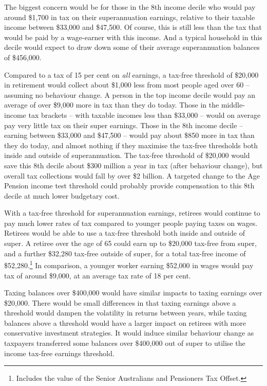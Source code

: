The biggest concern would be for those in the 8th income decile who would pay around \$1,700 in tax on their superannuation earnings, relative to their taxable income between \$33,000 and \$47,500. Of course, this is still less than the tax that would be paid by a wage-earner with this income. And a typical household in this decile would expect to draw down some of their average superannuation balances of \$456,000.

Compared to a tax of 15 per cent on \emph{all} earnings, a tax-free threshold of \$20,000 in retirement would collect about \$1,000 less from most people aged over 60 – assuming no behaviour change. A person in the top income decile would pay an average of over \$9,000 more in tax than they do today. Those in the middle-income tax brackets – with taxable incomes less than \$33,000 – would on average pay very little tax on their super earnings. Those in the 8th income decile – earning between \$33,000 and \$47,500 – would pay about \$850 more in tax than they do today, and almost nothing if they maximise the tax-free thresholds both inside and outside of superannuation. The tax-free threshold of \$20,000 would save this 8th decile about \$300 million a year in tax (after behaviour change), but overall tax collections would fall by over \$2 billion. A targeted change to the Age Pension income test threshold could probably provide compensation to this 8th decile at much lower budgetary cost. 

With a tax-free threshold for superannuation earnings, retirees would continue to pay much lower rates of tax compared to younger people paying taxes on wages. Retirees would be able to use a tax-free threshold both inside and outside of super. A retiree over the age of 65 could earn up to \$20,000 tax-free from super, and a further \$32,280 tax-free outside of super, for a total tax-free income of \$52,280.\footnote{Includes the value of the Senior Australians and Pensioners Tax Offset.} In comparison, a younger worker earning \$52,000 in wages would pay tax of around \$9,000, at an average tax rate of 18 per cent.

Taxing balances over \$400,000 would have similar impacts to taxing earnings over \$20,000. There would be small differences in that taxing earnings above a threshold would dampen the volatility in returns between years, while taxing balances above a threshold would have a larger impact on retirees with more conservative investment strategies. It would induce similar behaviour change as taxpayers transferred some balances over \$400,000 out of super to utilise the income tax-free earnings threshold. 

